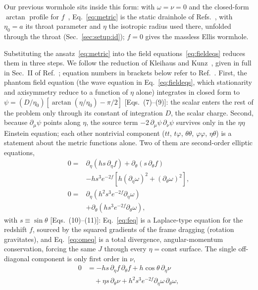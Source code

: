 \documentclass[twocolumn,floatfix,aps,prd,superscriptaddress,nofootinbib]{revtex4-2}
\begin{document}
Our previous wormhole sits inside this form: with $\omega=\nu=0$ and the closed-form $\arctan$ profile for $f$~\cite{chew2016}, Eq.~\eqref{eq:metric} is the static drainhole of Refs.~\cite{shirokov2026,shirokov2026c}, with $\eta_0=a$ its throat parameter and $\eta$ the isotropic radius used there, unfolded through the throat (Sec.~\ref{sec:setup:id}); $f=0$ gives the massless Ellis wormhole.

Substituting the ansatz~\eqref{eq:metric} into the field equations~\eqref{eq:fieldeqs} reduces them in three steps. We follow the reduction of Kleihaus and Kunz~\cite{kleihaus_kunz2014}, given in full in Sec.~II of Ref.~\cite{chew2016}; equation numbers in brackets below refer to Ref.~\cite{chew2016}. First, the phantom field equation (the wave equation in Eq.~\eqref{eq:fieldeqs}, which stationarity and axisymmetry reduce to a function of $\eta$ alone) integrates in closed form to $\psi=(D/\eta_0)\left[\arctan(\eta/\eta_0)-\pi/2\right]$ [Eqs.~(7)--(9)]: the scalar enters the rest of the problem only through its constant of integration $D$, the scalar charge. Second, because $\partial_\mu\psi$ points along $\eta$, the source term $-2\,\partial_\mu\psi\,\partial_\nu\psi$ survives only in the $\eta\eta$ Einstein equation; each other nontrivial component ($tt$, $t\varphi$, $\theta\theta$, $\varphi\varphi$, $\eta\theta$) is a statement about the metric functions alone. Two of them are second-order elliptic equations,
\begin{align}
0={}&\partial_\eta\!\left(h s\,\partial_\eta f\right)+\partial_\theta\!\left(s\,\partial_\theta f\right)\nonumber\\
&-h s^3 e^{-2f}\!\left[h(\partial_\eta\omega)^2+(\partial_\theta\omega)^2\right],
\label{eq:feq}\\
0={}&\partial_\eta\!\left(h^2 s^3 e^{-2f}\partial_\eta\omega\right)\nonumber\\
&+\partial_\theta\!\left(h s^3 e^{-2f}\partial_\theta\omega\right),
\label{eq:omeq}
\end{align}
with $s\equiv\sin\theta$ [Eqs.~(10)--(11)]: Eq.~\eqref{eq:feq} is a Laplace-type equation for the redshift $f$, sourced by the squared gradients of the frame dragging (rotation gravitates), and Eq.~\eqref{eq:omeq} is a total divergence, angular-momentum conservation, forcing the same $J$ through every $\eta=\mathrm{const}$ surface. The single off-diagonal component is only first order in $\nu$,
\begin{equation}
\begin{split}
0&=-h s\,\partial_\eta f\,\partial_\theta f+h\cos\theta\,\partial_\eta\nu\\
&\quad+\eta s\,\partial_\theta\nu+h^2 s^3 e^{-2f}\partial_\eta\omega\,\partial_\theta\omega,
\end{split}
\label{eq:constraint}
\end{equation}
\end{document}
